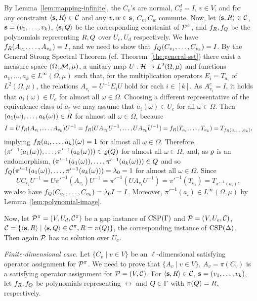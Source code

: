\documentclass[11pt,letter]{article}
\begin{document}
By Lemma~\ref{lem:mapping-infinite}, the $C_v$'s are normal, $C_v^d=I$, $v\in V$,
and for any constraint $\langle {\bf s},R \rangle\in{\mathcal C}$ and any $v,w\in{\bf s}$, $C_v,C_w$ commute.
Now, let $\langle {\bf s},R \rangle\in{\mathcal C}$, ${\bf s}=(v _1,\ldots, v _{k})$, $\langle {\bf s},Q \rangle$ be the
corresponding constraint of ${\mathcal P}^\pi$, and $f_R,f_Q$ be the polynomials representing $R,Q$ over $U_e,U_d$ respectively. We have $f_R(A_{v_1},\ldots, A_{v_k})=I$, and we need to show that $f_Q(C_{v_1},\ldots, C_{v_k})=I$. By the General Strong Spectral Theorem (cf. Theorem~\ref{the:general-sst}) there exist a measure space $(\Omega,{\mathcal M},\mu)$, a unitary map $U:{\mathcal H}\to L^2(\Omega,\mu)$ and functions $a_1,\dots,a_k\in L^\infty(\Omega,\mu)$ such that, for the multiplication operators $E_i = T_{a_i}$ of $L^2(\Omega,\mu)$, the relations $A_{v_i} = U^{-1} E_iU$ hold for each $i\in [k]$. As $A_{v_i}^e=I$, it holds that $a_i(\omega)\in U_e$ for almost all $\omega\in\Omega$. Choosing a different representative of the equivalence class of $a_i$ we may assume that $a_i(\omega)\in U_e$ for all $\omega\in\Omega$. Then $(a_1(\omega),\ldots, a_k(\omega))\in R$ for almost all $\omega\in\Omega$, because
\[
I=Uf_R(A_{v_1},\ldots, A_{v_k})U^{-1}=f_R(UA_{v_1}U^{-1},\ldots, UA_{v_k}U^{-1})= f_R(T_{a_i},\ldots, T_{a_k})=T_{f_R(a_i,\ldots, a_k)},
\]
implying $f_R(a_i,\ldots, a_k)(\omega)=1$ for almost all $\omega\in\Omega$. Therefore, $(\pi'^{-1}(a_1(\omega)),\ldots, \pi'^{-1}(a_k(\omega)))\in\varrho(Q)$ for almost all $\omega\in\Omega$, and, as $\varrho$ is an endomorphism, $(\pi'^{-1}(a_1(\omega)),\ldots, \pi'^{-1}(a_k(\omega)))\in Q$ and so $f_Q(\pi'^{-1}(a_1(\omega)),\ldots, \pi'^{-1}(a_k(\omega)))=\lambda_0=1$ for almost all $\omega\in\Omega$. Since 
\[
UC_{v_i}U^{-1}=U\pi'^{-1}(A_{v_i})U^{-1}=\pi'^{-1}(UA_{v_i}U^{-1})=\pi'^{-1}(T_{a_i})=T_{\pi'^{-1}(a_i)},
\]
we also have $f_Q(C_{v_1},\ldots, C_{v_k})=\lambda_0I=I$. Moreover, $\pi'^{-1}(a_i)\in L^\infty(\Omega,\mu)$ by Lemma~\ref{lem:polynomial-image}.

\smallskip

Now, let ${\mathcal P}^\pi=(V,U_d,{\mathcal C}^\pi)$ be a gap instance of ${\rm CSP}(\Gamma)$ and ${\mathcal P}=(V,U_e,{\mathcal C})$, ${\mathcal C}=\{\langle {\bf s},R \rangle\mid\langle {\bf s},Q \rangle\in{\mathcal C}^\pi,R=\pi(Q)\}$, the corresponding instance of ${\rm CSP}(\Delta)$. Then again ${\mathcal P}$ has no solution over $U_e$.

{\it Finite-dimensional case.}
Let $\{C_v\mid v\in V\}$ be an $\ell$-dimensional satisfying operator assignment for ${\mathcal P}^\pi$. We need to prove that $\{A_v\mid v\in V\}$, $A_v=\pi(C_v)$ is a satisfying operator assignment for ${\mathcal P}=(V,{\mathcal C})$. For $\langle {\bf s},R \rangle\in{\mathcal C}$, ${\bf s}=(v _1,\ldots, v _{k})$, let $f_R,f_Q$ be polynomials representing $\rel$ and $Q\in\Gamma$ with $\pi(Q)=R$, respectively. 
\end{document}
